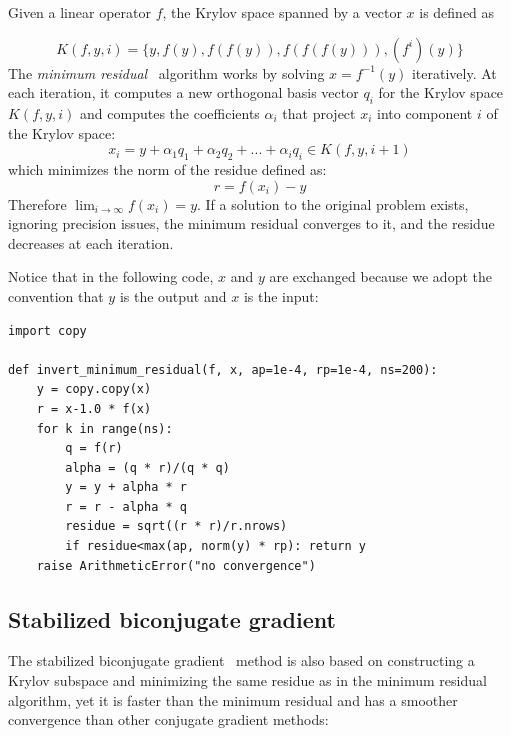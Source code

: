 \documentclass[justified, sixbynine]{tufte-book}
\def\ft{\small\tt}
\theoremstyle{plain}%
\newtheorem * {corollary}{Corollary}
\theoremstyle{definition}
\theoremstyle{remark}
\newtheorem * {remark}{Remark}
\newtheorem * {note}{Note}
\begin{document}
\begin{fullwidth}
Given a linear operator $f$, the Krylov space spanned by a vector $x$ is defined as

\begin{equation}
K(f, y, i) = \{y, f(y), f(f(y)), f(f(f(y))), (f^i)(y)\}
\end{equation}
The {\it minimum residual}~\cite{minres} algorithm works by solving $x=f^{-1}(y)$ iteratively. At each iteration, it computes a new orthogonal basis vector $q_i$ for the Krylov space $K(f, y, i)$ and computes the coefficients $\alpha_i$ that project $x_i$ into component $i$ of the Krylov space:
\begin{equation}
x_i = y + \alpha_1 q_1 + \alpha_2 q_2 + ... + \alpha_i q_i \in K(f, y, i+1)
\end{equation}
which minimizes the norm of the residue defined as:
\begin{equation}
r = f(x_i) - y
\end{equation}
Therefore $\lim_{i\rightarrow\infty} f(x_i) = y$.
If a solution to the original problem exists, ignoring precision issues, the minimum residual converges to it, and the residue decreases at each iteration.

Notice that in the following code, $x$ and $y$ are exchanged because we adopt the convention that $y$ is the output and $x$ is the input:

\begin{lstlisting}[caption={in file: {\ft nlib.py}}]
import copy

def invert_minimum_residual(f, x, ap=1e-4, rp=1e-4, ns=200):
    y = copy.copy(x)
    r = x-1.0 * f(x)
    for k in range(ns):
        q = f(r)
        alpha = (q * r)/(q * q)
        y = y + alpha * r
        r = r - alpha * q
        residue = sqrt((r * r)/r.nrows)
        if residue<max(ap, norm(y) * rp): return y
    raise ArithmeticError("no convergence")
\end{lstlisting}

\goodbreak\subsection{Stabilized biconjugate gradient}


The stabilized biconjugate gradient~\cite{bicgstab} method is also based on constructing a Krylov subspace and minimizing the same residue as in the minimum residual algorithm, yet it is faster than the minimum residual and has a smoother convergence than other conjugate gradient methods:


\end{fullwidth}
\end{document}
